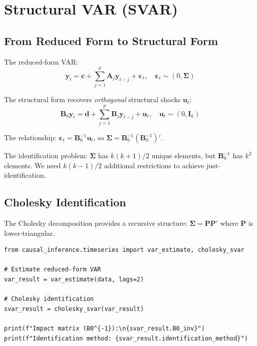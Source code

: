 \section{Structural VAR (SVAR)}

\subsection{From Reduced Form to Structural Form}

The reduced-form VAR:
\begin{equation}
\mathbf{y}_t = \mathbf{c} + \sum_{j=1}^{p} \mathbf{A}_j \mathbf{y}_{t-j} + \boldsymbol{\varepsilon}_t, \quad \boldsymbol{\varepsilon}_t \sim (0, \boldsymbol{\Sigma})
\end{equation}

The structural form recovers \textit{orthogonal} structural shocks $\mathbf{u}_t$:
\begin{equation}
\mathbf{B}_0 \mathbf{y}_t = \mathbf{d} + \sum_{j=1}^{p} \mathbf{B}_j \mathbf{y}_{t-j} + \mathbf{u}_t, \quad \mathbf{u}_t \sim (0, \mathbf{I}_k)
\end{equation}

The relationship: $\boldsymbol{\varepsilon}_t = \mathbf{B}_0^{-1} \mathbf{u}_t$, so $\boldsymbol{\Sigma} = \mathbf{B}_0^{-1} (\mathbf{B}_0^{-1})'$.

\begin{insight}
The identification problem: $\boldsymbol{\Sigma}$ has $k(k+1)/2$ unique elements, but $\mathbf{B}_0^{-1}$ has $k^2$ elements. We need $k(k-1)/2$ additional restrictions to achieve just-identification.
\end{insight}

\subsection{Cholesky Identification}

The Cholesky decomposition provides a recursive structure: $\boldsymbol{\Sigma} = \mathbf{P}\mathbf{P}'$ where $\mathbf{P}$ is lower-triangular.

\begin{verbatim}
from causal_inference.timeseries import var_estimate, cholesky_svar

# Estimate reduced-form VAR
var_result = var_estimate(data, lags=2)

# Cholesky identification
svar_result = cholesky_svar(var_result)

print(f"Impact matrix (B0^{-1}):\n{svar_result.B0_inv}")
print(f"Identification method: {svar_result.identification_method}")
\end{verbatim}

